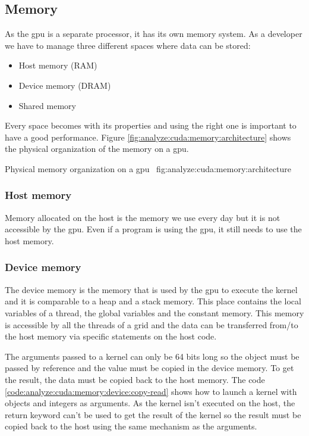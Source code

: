 \subsection{Memory}
\label{ch:analyze:cuda:memory}

As the \acrshort{gpu} is a separate processor, it has its own memory system.
As a developer we have to manage three different spaces where data can be stored:
\begin{itemize}
    \item Host memory (RAM)
    \item Device memory (DRAM)
    \item Shared memory
\end{itemize}

Every space becomes with its properties and using the right one is important to
have a good performance.
Figure \ref{fig:analyze:cuda:memory:architecture} shows the physical
organization of the memory on a \acrshort{gpu}.

{Physical memory organization on a \acrshort{gpu}~\cite{cuda-training}}
{fig:analyze:cuda:memory:architecture}


\subsubsection{Host memory}
\label{ch:analyze:cuda:memory:host}

Memory allocated on the host is the memory we use every day but it is not
accessible by the \acrshort{gpu}.
Even if a program is using the \acrshort{gpu}, it still needs to use the host
memory.

\subsubsection{Device memory}
\label{ch:analyze:cuda:memory:device}

The device memory is the memory that is used by the \acrshort{gpu} to execute
the kernel and it is comparable to a heap and a stack memory.
This place contains the local variables of a thread, the global variables and
the constant memory.
This memory is accessible by all the threads of a grid and the data can be
transferred from/to the host memory via specific statements on the host code.

The arguments passed to a kernel can only be 64 bits long so the object must be
passed by reference and the value must be copied in the device memory.
To get the result, the data must be copied back to the host memory.
The code \ref{code:analyze:cuda:memory:device:copy-read} shows how to launch a
kernel with objects and integers as arguments.
As the kernel isn't executed on the host, the return keyword can't be used to
get the result of the kernel so the result must be copied back to the host
using the same mechanism as the arguments.

